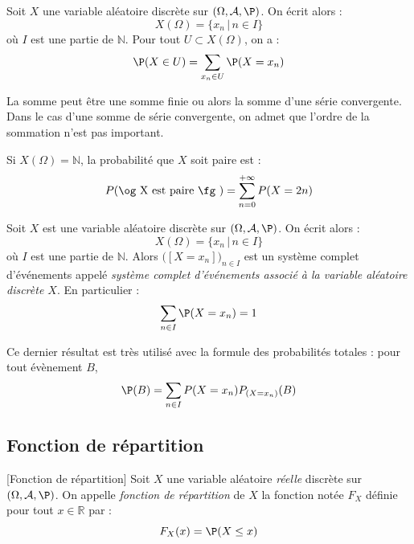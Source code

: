 \documentclass[french,11pt,twoside]{VcCours}
\begin{document}
\begin{Proposition}{} Soit $X$ une variable aléatoire discrète sur $(\Omega, \mathcal{A}, \P)$. On écrit alors :
$$ X(\Omega)= \lbrace x_n \, \vert \, n \in I \rbrace$$
où $I$ est une partie de $\mathbb{N}$. Pour tout $U \subset X(\Omega)$, on a :
$$ \P(X \in U) = \sum_{x_n \in U} \P(X=x_n)$$
\end{Proposition}

\begin{Remarque}{} La somme peut être une somme finie ou alors la somme d'une série convergente. Dans le cas d'une somme de série convergente, on admet que l'ordre de la sommation n'est pas important.
\end{Remarque}

\begin{Demonstration}{} 

\vspace{3cm}
\end{Demonstration}

\begin{Exemple}{} Si $X(\Omega) = \mathbb{N}$, la probabilité que $X$ soit paire est :
$$ P(\hbox{\og X est paire \fg }) = \sum_{n=0}^{+ \infty} P(X=2n)$$
\end{Exemple}

\begin{Corollaire}{} Soit $X$ est une variable aléatoire discrète sur $(\Omega, \mathcal{A}, \P)$.  On écrit alors :
$$ X(\Omega)= \lbrace x_n \, \vert \, n \in I \rbrace$$
où $I$ est une partie de $\mathbb{N}$. Alors $\big([X=x_n]\big)_{n \in I}$  est un système complet d'événements appelé \emph{système complet d'événements associé à la variable aléatoire discrète $X$}. En particulier :
$$\sum_{n \in I} \P(X=x_n) = 1$$
\end{Corollaire}

\medskip

Ce dernier résultat est très utilisé avec la formule des probabilités totales : pour tout évènement $B$,
$$ \P(B) = \sum_{n \in I} P(X=x_n) P_{(X=x_n)}(B)$$

\subsection{Fonction de répartition}


\begin{Definition}{}[Fonction de répartition]
Soit $X$ une variable aléatoire \emph{réelle} discrète sur $(\Omega, \mathcal{A}, \P)$. On appelle \emph{fonction de répartition} de $X$ la fonction notée $F_X$ définie pour tout $x \in \mathbb{R}$ par :
$$F_X(x) = \P(X \leq x) $$
\end{Definition}
\end{document}
